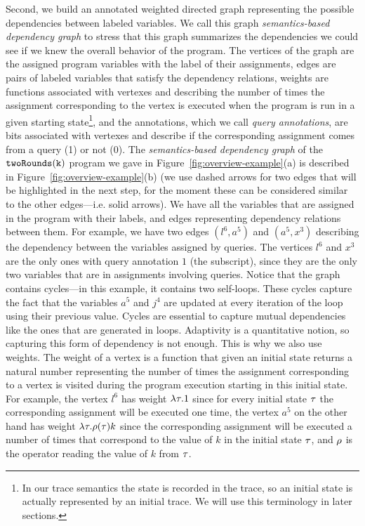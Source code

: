 Second, we build an annotated weighted directed graph representing the possible dependencies between labeled variables. We call this graph \emph{semantics-based dependency graph} to stress that this graph summarizes the dependencies we could see if we knew the overall behavior of the program. 
The vertices of the graph are the assigned program variables with the label of their assignments, edges are pairs of labeled variables that satisfy the dependency relations, weights are functions associated with vertexes and describing the number of times the assignment corresponding to the vertex is executed when the program is run in a given starting state\footnote{In our trace semantics the state is recorded in the trace, so an initial state is actually represented by an initial trace. We will use this terminology in later sections.}, and the annotations, which we call \emph{query annotations}, are bits associated with vertexes and describe if the corresponding assignment comes from a query (1) or not (0).
The \emph{semantics-based dependency graph} of the $\mathtt{twoRounds(k)}$ program
we gave in Figure~\ref{fig:overview-example}(a) is described in Figure~\ref{fig:overview-example}(b) (we use dashed arrows for two edges that will be highlighted in the next step, for the moment these can be considered similar to the other edges---i.e. solid arrows). We have all the variables that are assigned in the program with their labels, and edges representing dependency relations between them. 
For example, we have two edges $(l^6, a^5)$ and $(a^5, x^3)$ describing the dependency between the variables assigned by queries. The vertices $l^6$ and $x^3$ are the only ones with query annotation $1$ (the subscript), since they are the only two variables that are in assignments involving queries. Notice that the graph contains cycles---in this example, it contains two self-loops. These cycles capture the fact that the variables $a^5$ and $j^4$ are updated at every iteration of the loop using their previous value. Cycles are essential to capture mutual dependencies like the ones that are generated in loops. Adaptivity is a quantitative notion, so capturing this form of dependency is not enough. This is why we also use weights. The weight of a vertex is a function that given an initial state returns a natural number representing 
the number of times the assignment corresponding to a vertex is visited during the program execution starting in this initial state. 
For example, the vertex $l^{6}$ has weight {$\lambda \mathtt{\tau}.1$} since for every initial state {$\mathtt{\tau}$} the corresponding assignment will be executed one time, the vertex $a^5$ on the other hand has weight 
$\lambda \mathtt{\tau}. \rho(\mathtt{\tau}) k$ since the corresponding assignment will be executed a number of times that correspond to the value of $k$ in the initial state $\mathtt{\tau}$, and $\rho$ is the operator reading the value of $k$ from $\mathtt{\tau}$.

